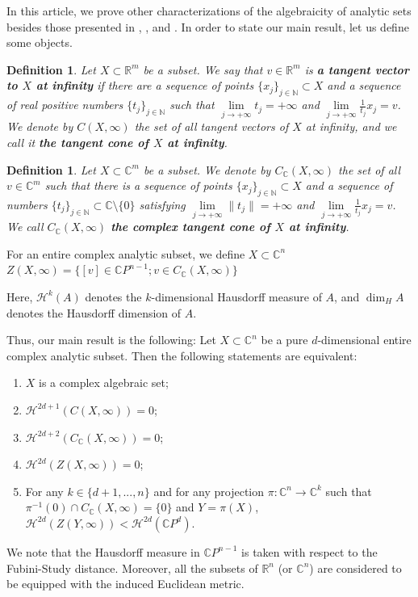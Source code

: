 \documentclass[a4paper,11pt]{amsart}
\newtheorem{definition}[theorem]{Definition}
\newenvironment{customthm}[1]
  {\renewcommand\theinnercustomthm{#1}\innercustomthm}
  {\endinnercustomthm}
\newcommand{\C}{\mathbb C}
\newcommand{\R}{\mathbb R}
\newcommand{\N}{\mathbb N}
\begin{document}
In this article, we prove other characterizations of the algebraicity of analytic sets besides those presented in \cite{Sampaio:2023}, \cite{SampaioS:2024}, and \cite{PeterzilS:2009}.
In order to state our main result, let us define some objects.


\begin{definition}\label{def:realtangentcone}
Let $X\subset \R^m$ be a subset. We say that $v\in \mathbb{R}^{m}$ is {\bf a tangent vector to $X$ at infinity} if there are a sequence of points $\{x_j\}_{j\in \N}\subset X$ and a sequence of real positive numbers $\{t_j\}_{j\in \N}$ such that $\lim\limits _{j\to +\infty }t_j= +\infty$ and $\lim\limits _{j\to +\infty }\frac{1}{t_j}x_j=v$.
We denote by $C(X,\infty)$ the set of all tangent vectors of $X$ at infinity, and we call it {\bf the tangent cone of $X$ at infinity}.
\end{definition}
\begin{definition}\label{complextangentcone}
Let $X\subset \C^m$ be a subset. 
We denote by $C_{\C}(X,\infty)$ the set of all $v\in \mathbb{C}^{m}$ such that there is a sequence of points $\{x_j\}_{j\in \N}\subset X$ and a sequence of numbers $\{t_j\}_{j\in \N}\subset \C\setminus \{0\}$ satisfying $\lim\limits _{j\to +\infty }\|t_j\|= +\infty$ and $\lim\limits _{j\to +\infty }\frac{1}{t_j}x_j=v$. We call $C_{\C}(X,\infty)$ {\bf the complex tangent cone of $X$ at infinity}.
\end{definition}
For an entire complex analytic subset, we define $X\subset\C^n$ $Z(X,\infty)=\{[v]\in \mathbb{C}P^{n-1};v\in C_{\mathbb{C}}(X,\infty)\}$

Here, $\mathcal{H}^{k}(A)$ denotes the $k$-dimensional Hausdorff measure of $A$, and $\dim_H A$ denotes the Hausdorff dimension of $A$. 

Thus, our main result is the following:
\begin{customthm}{\ref*{chow-type-thm}}
Let $X\subset\C^n$ be a pure $d$-dimensional entire complex analytic subset. Then the following statements are equivalent:
\begin{enumerate}
 \item $X$ is a complex algebraic set;
 \item $\mathcal{H}^{2d+1}(C(X,\infty))=0$;
 \item $\mathcal{H}^{2d+2}(C_{\mathbb{C}}(X,\infty))=0$;
 \item $\mathcal{H}^{2d}(Z(X,\infty))=0$;
 \item For any $k\in\{d+1,...,n\}$ and for any projection $\pi\colon \mathbb{C}^{n}\to \mathbb{C}^{k}$ such that $\pi^{-1}(0)\cap C_{\mathbb{C}}(X,\infty)=\{0\}$ and $Y=\pi(X)$, $\mathcal{H}^{2d}(Z(Y,\infty))<\mathcal{H}^{2d}(\mathbb{C}P^{d})$.
\end{enumerate}
\end{customthm}
We note that the Hausdorff measure in $\mathbb{C}P^{n-1}$ is taken with respect to the Fubini-Study distance. Moreover, all the subsets of $\R^n$ (or $\C^n$) are considered to be equipped with the induced Euclidean metric.
\end{document}
